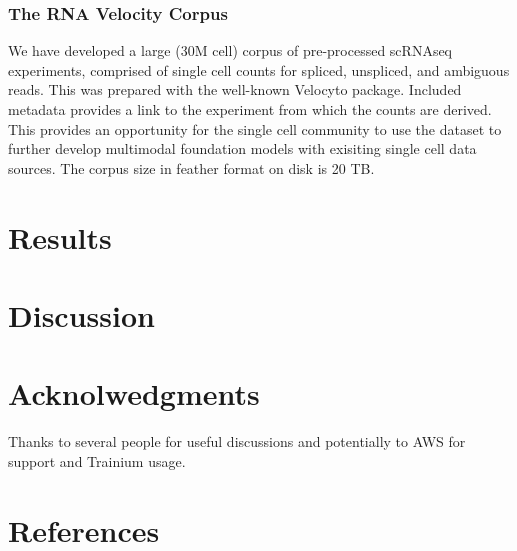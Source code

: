 \documentclass{article} %
\begin{document}
    \subsubsection{The RNA Velocity Corpus}
We have developed a large (30M cell) corpus of pre-processed scRNAseq experiments, comprised of single cell counts for spliced, unspliced, and ambiguous reads. This was prepared with the well-known Velocyto package. Included metadata provides a link to the experiment from which the counts are derived. This provides an opportunity for the single cell community to use the dataset to further develop multimodal foundation models with exisiting single cell data sources. The corpus size in feather format on disk is 20 TB.  \section{Results}

  \section{Discussion}
  
  \section{Acknolwedgments}
  Thanks to several people for useful discussions and potentially to AWS for support and Trainium usage.
 \section{References}


\end{document}
